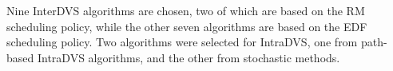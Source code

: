 \documentclass[10pt,article]{IEEEtran}
\begin{document}
Nine  InterDVS  algorithms  are chosen, two of which are based on the RM scheduling policy, while the other seven algorithms are based on the EDF scheduling policy. Two algorithms were selected for IntraDVS, one from path-based IntraDVS algorithms, and the other from stochastic methods. 




%
\end{document}
